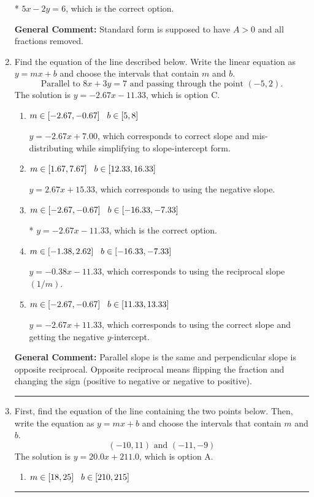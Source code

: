 \documentclass{extbook}[14pt]
\newcommand{\litem}[1]{\item #1

\rule{\textwidth}{0.4pt}}
\begin{document}
\begin{enumerate}
{\begin{enumerate}[label=\Alph*.]
* $5x - 2y = 6$, which is the correct option.
\end{enumerate}

\textbf{General Comment:} Standard form is supposed to have $A > 0$ and all fractions removed.
}
\litem{
Find the equation of the line described below. Write the linear equation as $ y=mx+b $ and choose the intervals that contain $m$ and $b$.
\[ \text{Parallel to } 8 x + 3 y = 7 \text{ and passing through the point } (-5, 2). \]The solution is \( y = -2.67x - 11.33 \), which is option C.\begin{enumerate}[label=\Alph*.]
\item \( m \in [-2.67, -0.67] \hspace*{3mm} b \in [5, 8] \)

 $y = -2.67x + 7.00$, which corresponds to correct slope and mis-distributing while simplifying to slope-intercept form.
\item \( m \in [1.67, 7.67] \hspace*{3mm} b \in [12.33, 16.33] \)

 $y = 2.67x + 15.33$, which corresponds to using the negative slope.
\item \( m \in [-2.67, -0.67] \hspace*{3mm} b \in [-16.33, -7.33] \)

* $y = -2.67x - 11.33$, which is the correct option.
\item \( m \in [-1.38, 2.62] \hspace*{3mm} b \in [-16.33, -7.33] \)

 $y = -0.38x - 11.33$, which corresponds to using the reciprocal slope $(1/m)$.
\item \( m \in [-2.67, -0.67] \hspace*{3mm} b \in [11.33, 13.33] \)

 $y = -2.67x + 11.33$, which corresponds to using the correct slope and getting the negative $y$-intercept.
\end{enumerate}

\textbf{General Comment:} Parallel slope is the same and perpendicular slope is opposite reciprocal. Opposite reciprocal means flipping the fraction and changing the sign (positive to negative or negative to positive).
}
\litem{
First, find the equation of the line containing the two points below. Then, write the equation as $ y=mx+b $ and choose the intervals that contain $m$ and $b$.
\[ (-10, 11) \text{ and } (-11, -9) \]The solution is \( y = 20.0x + 211.0 \), which is option A.\begin{enumerate}[label=\Alph*.]
\item \( m \in [18, 25] \hspace*{3mm} b \in [210, 215] \)


\end{enumerate}}
\end{enumerate}
\end{document}
